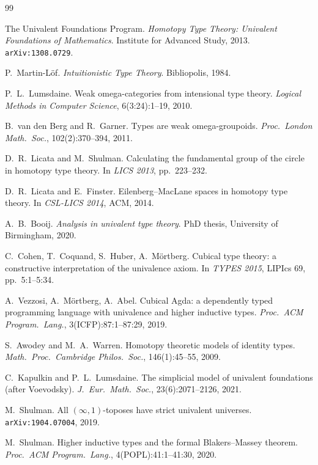\documentclass[12pt]{article}
\theoremstyle{definition}
\theoremstyle{remark}
\begin{document}
\begin{thebibliography}{99}

The Univalent Foundations Program.
\emph{Homotopy Type Theory: Univalent Foundations of Mathematics}.
Institute for Advanced Study, 2013. \texttt{arXiv:1308.0729}.

P.\ Martin-L\"of.
\emph{Intuitionistic Type Theory}. Bibliopolis, 1984.

P.\ L.\ Lumsdaine. Weak omega-categories from intensional type theory.
\emph{Logical Methods in Computer Science}, 6(3:24):1--19, 2010.

B.\ van den Berg and R.\ Garner. Types are weak omega-groupoids.
\emph{Proc.\ London Math.\ Soc.}, 102(2):370--394, 2011.

D.\ R.\ Licata and M.\ Shulman. Calculating the fundamental group of the
circle in homotopy type theory.
In \emph{LICS 2013}, pp.\ 223--232.

D.\ R.\ Licata and E.\ Finster. Eilenberg--MacLane spaces in homotopy type
theory. In \emph{CSL-LICS 2014}, ACM, 2014.

A.\ B.\ Booij. \emph{Analysis in univalent type theory}. PhD thesis,
University of Birmingham, 2020.

C.\ Cohen, T.\ Coquand, S.\ Huber, A.\ M\"ortberg.
Cubical type theory: a constructive interpretation of the univalence
axiom. In \emph{TYPES 2015}, LIPIcs 69, pp.\ 5:1--5:34.

A.\ Vezzosi, A.\ M\"ortberg, A.\ Abel.
Cubical Agda: a dependently typed programming language with univalence and
higher inductive types.
\emph{Proc.\ ACM Program.\ Lang.}, 3(ICFP):87:1--87:29, 2019.

S.\ Awodey and M.\ A.\ Warren.
Homotopy theoretic models of identity types.
\emph{Math.\ Proc.\ Cambridge Philos.\ Soc.}, 146(1):45--55, 2009.

C.\ Kapulkin and P.\ L.\ Lumsdaine.
The simplicial model of univalent foundations (after Voevodsky).
\emph{J.\ Eur.\ Math.\ Soc.}, 23(6):2071--2126, 2021.

M.\ Shulman. All $(\infty,1)$-toposes have strict univalent universes.
\texttt{arXiv:1904.07004}, 2019.

M.\ Shulman. Higher inductive types and the formal Blakers--Massey theorem.
\emph{Proc.\ ACM Program.\ Lang.}, 4(POPL):41:1--41:30, 2020.


\end{thebibliography}
\end{document}
